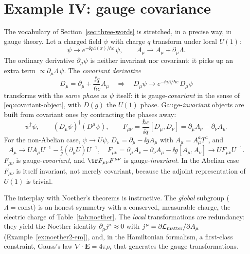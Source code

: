 \section{Example IV: gauge covariance}
\label{sec:gauge}

The vocabulary of Section~\ref{sec:three-words} is stretched, in a
precise way, in gauge theory. Let a charged field $\psi$ with charge $q$
transform under local $U(1)$:
\begin{equation}\label{eq:u1}
  \psi\to e^{-\ii q\Lambda(x)/\hbar c}\,\psi,\qquad
  A_\mu\to A_\mu+\partial_\mu\Lambda .
\end{equation}
The ordinary derivative $\partial_\mu\psi$ is neither invariant nor covariant:
it picks up an extra term $\propto\partial_\mu\Lambda\,\psi$. The
\emph{covariant derivative}
\begin{equation}\label{eq:covder}
  D_\mu=\partial_\mu+\frac{\ii q}{\hbar c}A_\mu
  \quad\Longrightarrow\quad
  D_\mu\psi\to e^{-\ii q\Lambda/\hbar c}\,D_\mu\psi
\end{equation}
transforms with the \emph{same phase} as $\psi$ itself: it is
gauge-\emph{covariant} in the sense of \eqref{eq:covariant-object}, with
$D(g)$ the $U(1)$ phase. Gauge-\emph{invariant} objects are built from
covariant ones by contracting the phases away:
\begin{equation}
  \psi^\dagger\psi,\qquad(D_\mu\psi)^\dagger(D^\mu\psi),\qquad
  F_{\mu\nu}=\frac{\hbar c}{\ii q}[D_\mu,D_\nu]=\partial_\mu A_\nu-\partial_\nu A_\mu .
\end{equation}
For the non-Abelian case, $\psi\to U\psi$, $D_\mu=\partial_\mu-\ii gA_\mu$
with $A_\mu=A_\mu^aT^a$, and
\begin{equation}
  A_\mu\to UA_\mu U^{-1}-\tfrac{\ii}{g}(\partial_\mu U)U^{-1},\quad
  F_{\mu\nu}=\partial_\mu A_\nu-\partial_\nu A_\mu-\ii g[A_\mu,A_\nu]\to UF_{\mu\nu}U^{-1}.
\end{equation}
$F_{\mu\nu}$ is gauge-\emph{covariant}, and $\tr F_{\mu\nu}F^{\mu\nu}$ is
gauge-\emph{invariant}. In the Abelian case $F_{\mu\nu}$ is itself invariant,
not merely covariant, because the adjoint representation of $U(1)$ is trivial.

The interplay with Noether's theorems is instructive. The \emph{global} subgroup
($\Lambda=\text{const}$) is an honest symmetry with a conserved, measurable
charge, the electric charge of Table~\ref{tab:noether}. The \emph{local}
transformations are redundancy: they yield the Noether identity
$\partial_\mu j^\mu\approx0$ with $j^\mu=\partial\mathcal L_{\rm matter}/\partial A_\mu$
(Example~\ref{ex:noether2-em}), and, in the Hamiltonian formalism,
a first-class constraint, Gauss's law $\nabla\!\cdot{\bm{E}}=4\pi\rho$, that
generates the gauge transformations.

